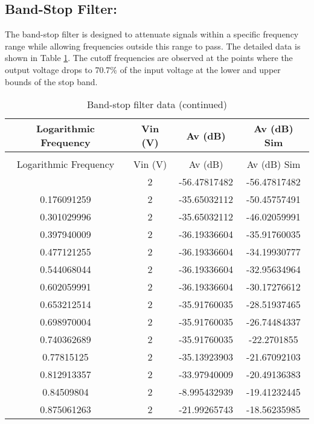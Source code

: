 \documentclass[a4paper, 12pt]{extarticle}
\begin{document}
\subsection{Band-Stop Filter:}
The band-stop filter is designed to attenuate signals within a specific frequency range while allowing frequencies outside this range to pass. The detailed data is shown in Table \ref{tab:Band_Stop_Filter_Data}. The cutoff frequencies are observed at the points where the output voltage drops to 70.7\% of the input voltage at the lower and upper bounds of the stop band.

\begin{longtable}{cccc}
    \caption{Band-stop filter data} \label{tab:Band_Stop_Filter_Data} \\
    \toprule
    Logarithmic Frequency & Vin (V) & Av (dB) & Av (dB) Sim \\
    \midrule
    \endfirsthead
    \caption[]{Band-stop filter data (continued)} \\
    \toprule
    Logarithmic Frequency & Vin (V) & Av (dB) & Av (dB) Sim \\
    \midrule
    \endhead
    \bottomrule
    \endfoot
    0     & 2     & -56.47817482 & -56.47817482 \\
    0.176091259 & 2     & -35.65032112 & -50.45757491 \\
    0.301029996 & 2     & -35.65032112 & -46.02059991 \\
    0.397940009 & 2     & -36.19336604 & -35.91760035 \\
    0.477121255 & 2     & -36.19336604 & -34.19930777 \\
    0.544068044 & 2     & -36.19336604 & -32.95634964 \\
    0.602059991 & 2     & -36.19336604 & -30.17276612 \\
    0.653212514 & 2     & -35.91760035 & -28.51937465 \\
    0.698970004 & 2     & -35.91760035 & -26.74484337 \\
    0.740362689 & 2     & -35.91760035 & -22.2701855 \\
    0.77815125 & 2     & -35.13923903 & -21.67092103 \\
    0.812913357 & 2     & -33.97940009 & -20.49136383 \\
    0.84509804 & 2     & -8.995432939 & -19.41232445 \\
    0.875061263 & 2     & -21.99265743 & -18.56235985 \\

\end{longtable}
\end{document}
